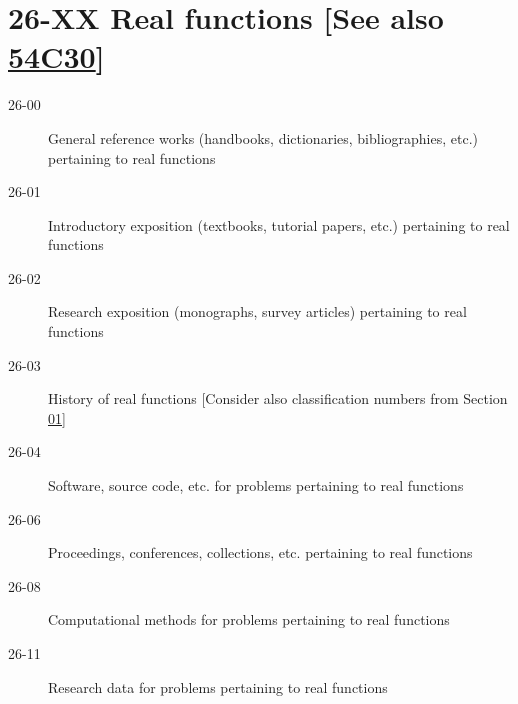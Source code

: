 \documentclass[letterpaper]{article}
\begin{document}
\section*{26-XX Real functions [See also \hyperref[54C30]{54C30}] }\label{26-XX}
\begin{description}
\item [26-00]\label{26-00} General reference works (handbooks, dictionaries, bibliographies, etc.) pertaining to real functions
\item [26-01]\label{26-01} Introductory exposition (textbooks, tutorial papers, etc.) pertaining to real functions
\item [26-02]\label{26-02} Research exposition (monographs, survey articles) pertaining to real functions
\item [26-03]\label{26-03} History of real functions [Consider also classification numbers from Section \hyperref[01-XX]{01}]
\item [26-04]\label{26-04} Software, source code, etc. for problems pertaining to real functions
\item [26-06]\label{26-06} Proceedings, conferences, collections, etc. pertaining to real functions
\item [26-08]\label{26-08} Computational methods for problems pertaining to real functions
\item [26-11]\label{26-11} Research data for problems pertaining to real functions
\end{description}
\end{document}
